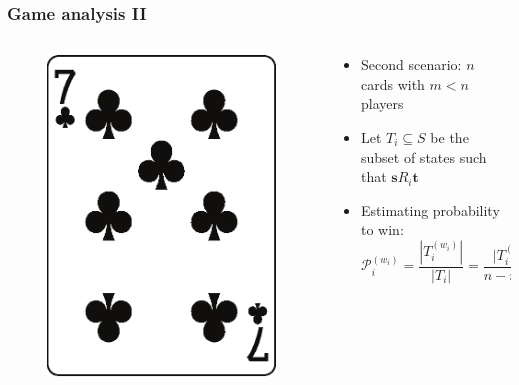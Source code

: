 \documentclass[10pt]{beamer}
\begin{document}
\begin{frame}
\frametitle{Game analysis II}
 \begin{columns}
  \begin{column}{3cm}
   \begin{figure}
    \includegraphics[width=\linewidth]{im/clubs_7.eps}
   \end{figure}
  \end{column}
  
  \begin{column}{7cm}
    \begin{itemize}[label=$\clubsuit$]
      \item Second scenario: $n$ cards with $m < n$ players
      \item Let $T_i \subseteq S$ be the subset of states such that $\boldsymbol s R_i \boldsymbol t$
      \item Estimating probability to win:
      \begin{equation*}   
\mathcal{P}^{(w_i)}_i = \frac{|T^{(w_i)}_i|}{|T_i|} = \frac{\lvert T^{(w_i)}_i\rvert}{n-m+1}
      \end{equation*}

    \end{itemize}
  \end{column}
 \end{columns}
\end{frame}
\end{document}
